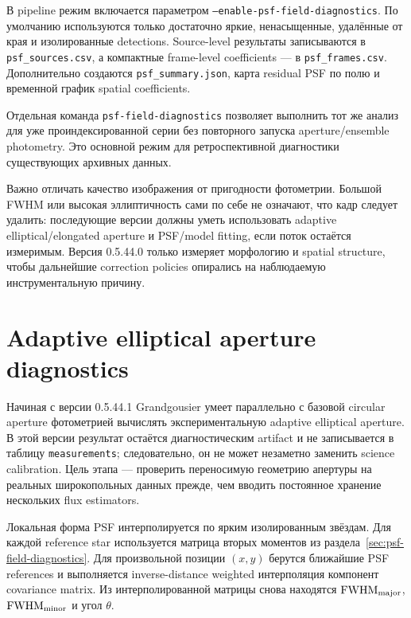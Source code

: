 В pipeline режим включается параметром
\texttt{--enable-psf-field-diagnostics}. По умолчанию используются только достаточно яркие,
ненасыщенные, удалённые от края и изолированные detections. Source-level результаты записываются
в \texttt{psf\_sources.csv}, а компактные frame-level coefficients --- в
\texttt{psf\_frames.csv}. Дополнительно создаются \texttt{psf\_summary.json}, карта residual PSF
по полю и временной график spatial coefficients.

Отдельная команда \texttt{psf-field-diagnostics} позволяет выполнить тот же анализ для уже
проиндексированной серии без повторного запуска aperture/ensemble photometry. Это основной
режим для ретроспективной диагностики существующих архивных данных.

Важно отличать качество изображения от пригодности фотометрии. Большой FWHM или высокая
эллиптичность сами по себе не означают, что кадр следует удалить: последующие версии
\program{} должны уметь использовать adaptive elliptical/elongated aperture и PSF/model fitting,
если поток остаётся измеримым. Версия 0.5.44.0 только измеряет морфологию и spatial structure,
чтобы дальнейшие correction policies опирались на наблюдаемую инструментальную причину.

\section{Adaptive elliptical aperture diagnostics}
\label{sec:adaptive-aperture-diagnostics}

Начиная с версии 0.5.44.1 Grandgousier умеет параллельно с базовой circular aperture
фотометрией вычислять экспериментальную adaptive elliptical aperture. В этой версии результат
остаётся диагностическим artifact и не записывается в таблицу \texttt{measurements}; следовательно,
он не может незаметно заменить science calibration. Цель этапа --- проверить переносимую
геометрию апертуры на реальных широкопольных данных прежде, чем вводить постоянное хранение
нескольких flux estimators.

Локальная форма PSF интерполируется по ярким изолированным звёздам. Для каждой reference star
используется матрица вторых моментов из раздела~\ref{sec:psf-field-diagnostics}. Для произвольной
позиции $(x,y)$ берутся ближайшие PSF references и выполняется inverse-distance weighted
интерполяция компонент covariance matrix. Из интерполированной матрицы снова находятся
${\rm FWHM}_{\rm major}$, ${\rm FWHM}_{\rm minor}$ и угол $\theta$.

